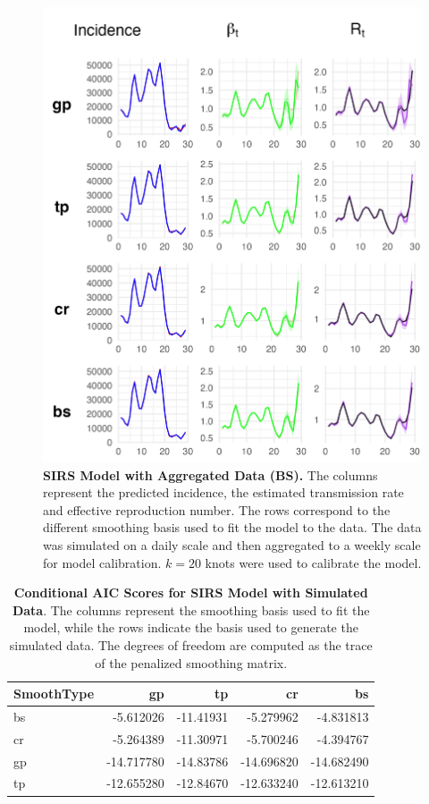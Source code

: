 \documentclass[
11pt, %
oneside, %
english, %
singlespacing, %
]{macthesis} %
\begin{document}
\begin{figure}[H]
\centering
\includegraphics[width=\textwidth]{figure/Simulated/aggregated/sim_agg_combined_bs.png}
\caption[SIRS model with aggregated data (BS).]{\textbf{SIRS Model with Aggregated Data (BS).} The columns represent the predicted incidence, the estimated transmission rate and effective reproduction number. The rows correspond to the different smoothing basis used to fit the model to the data. The data was simulated on a daily scale and then aggregated to a weekly scale for model calibration. \(k=20\) knots were used to calibrate the model.}
\label{fig:sim_agg_bs}
\end{figure}

\begin{table}[!h]
\centering
\caption{\label{tab:aic-table-sim}\textbf{Conditional AIC Scores for SIRS Model with Simulated Data}. The columns represent the smoothing basis used to fit the model, while the rows indicate the basis used to generate the simulated data. The degrees of freedom are computed as the trace of the penalized smoothing matrix.}
\centering
\begin{tabular}[t]{lrrrr}
\toprule
SmoothType & gp & tp & cr & bs\\
\midrule
bs & -5.612026 & -11.41931 & -5.279962 & -4.831813\\
cr & -5.264389 & -11.30971 & -5.700246 & -4.394767\\
gp & -14.717780 & -14.83786 & -14.696820 & -14.682490\\
tp & -12.655280 & -12.84670 & -12.633240 & -12.613210\\
\bottomrule
\end{tabular}
\end{table}
\end{document}
